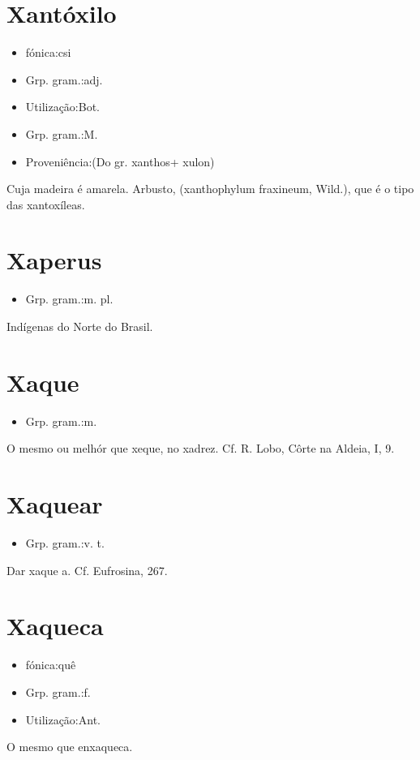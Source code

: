 \section{Xantóxilo}
\begin{itemize}
\item {fónica:csi}
\end{itemize}
\begin{itemize}
\item {Grp. gram.:adj.}
\end{itemize}
\begin{itemize}
\item {Utilização:Bot.}
\end{itemize}
\begin{itemize}
\item {Grp. gram.:M.}
\end{itemize}
\begin{itemize}
\item {Proveniência:(Do gr. \textunderscore xanthos\textunderscore  + \textunderscore xulon\textunderscore )}
\end{itemize}
Cuja madeira é amarela.
Arbusto, (\textunderscore xanthophylum fraxineum\textunderscore , Wild.), que é o tipo das xantoxíleas.
\section{Xaperus}
\begin{itemize}
\item {Grp. gram.:m. pl.}
\end{itemize}
Indígenas do Norte do Brasil.
\section{Xaque}
\begin{itemize}
\item {Grp. gram.:m.}
\end{itemize}
O mesmo ou melhór que \textunderscore xeque\textunderscore , no xadrez. Cf. R. Lobo, \textunderscore Côrte na Aldeia\textunderscore , I, 9.
\section{Xaquear}
\begin{itemize}
\item {Grp. gram.:v. t.}
\end{itemize}
Dar xaque a. Cf. \textunderscore Eufrosina\textunderscore , 267.
\section{Xaqueca}
\begin{itemize}
\item {fónica:quê}
\end{itemize}
\begin{itemize}
\item {Grp. gram.:f.}
\end{itemize}
\begin{itemize}
\item {Utilização:Ant.}
\end{itemize}
O mesmo que \textunderscore enxaqueca\textunderscore .
